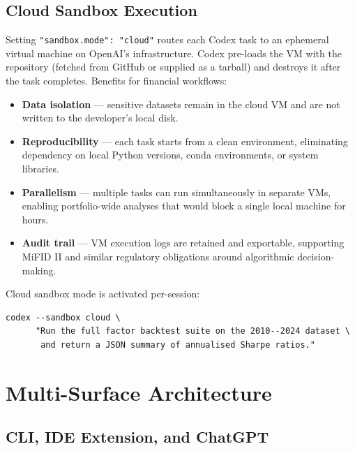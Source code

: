 \subsection{Cloud Sandbox Execution}
\label{app:codex:cloud}

Setting \texttt{"sandbox.mode": "cloud"} routes each Codex task to an
ephemeral virtual machine on OpenAI's infrastructure.  Codex pre-loads the VM
with the repository (fetched from GitHub or supplied as a tarball) and destroys
it after the task completes.  Benefits for financial workflows:

\begin{itemize}
  \item \textbf{Data isolation} --- sensitive datasets remain in the cloud VM
        and are not written to the developer's local disk.
  \item \textbf{Reproducibility} --- each task starts from a clean environment,
        eliminating dependency on local Python versions, conda environments, or
        system libraries.
  \item \textbf{Parallelism} --- multiple tasks can run simultaneously in
        separate VMs, enabling portfolio-wide analyses that would block a single
        local machine for hours.
  \item \textbf{Audit trail} --- VM execution logs are retained and exportable,
        supporting MiFID II and similar regulatory obligations around algorithmic
        decision-making.
\end{itemize}

Cloud sandbox mode is activated per-session:

\begin{verbatim}
codex --sandbox cloud \
      "Run the full factor backtest suite on the 2010--2024 dataset \
       and return a JSON summary of annualised Sharpe ratios."
\end{verbatim}

\section{Multi-Surface Architecture}
\label{app:codex:surfaces}

\subsection{CLI, IDE Extension, and ChatGPT}
\label{app:codex:surfaces-main}

